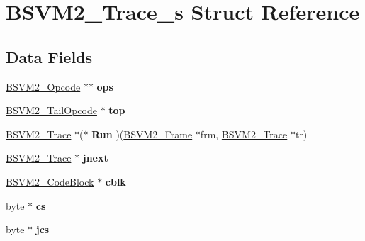 \hypertarget{structBSVM2__Trace__s}{\section{B\-S\-V\-M2\-\_\-\-Trace\-\_\-s Struct Reference}
\label{structBSVM2__Trace__s}
}
\subsection*{Data Fields}
\begin{DoxyCompactItemize}
\item 
\hypertarget{structBSVM2__Trace__s_ad7c1ddfecd2882938c69df3764f0cb3a}{\hyperlink{structBSVM2__Opcode__s}{B\-S\-V\-M2\-\_\-\-Opcode} $\ast$$\ast$ {\bfseries ops}}\label{structBSVM2__Trace__s_ad7c1ddfecd2882938c69df3764f0cb3a}

\item 
\hypertarget{structBSVM2__Trace__s_a4387e192d2bc912200ddb43d1f6862f5}{\hyperlink{structBSVM2__TailOpcode__s}{B\-S\-V\-M2\-\_\-\-Tail\-Opcode} $\ast$ {\bfseries top}}\label{structBSVM2__Trace__s_a4387e192d2bc912200ddb43d1f6862f5}

\item 
\hypertarget{structBSVM2__Trace__s_a6c3e9d1f1dbb248825d27df60f03aa25}{\hyperlink{structBSVM2__Trace__s}{B\-S\-V\-M2\-\_\-\-Trace} $\ast$($\ast$ {\bfseries Run} )(\hyperlink{structBSVM2__Frame__s}{B\-S\-V\-M2\-\_\-\-Frame} $\ast$frm, \hyperlink{structBSVM2__Trace__s}{B\-S\-V\-M2\-\_\-\-Trace} $\ast$tr)}\label{structBSVM2__Trace__s_a6c3e9d1f1dbb248825d27df60f03aa25}

\item 
\hypertarget{structBSVM2__Trace__s_a9c812857dfb6549234de053e43f4d47c}{\hyperlink{structBSVM2__Trace__s}{B\-S\-V\-M2\-\_\-\-Trace} $\ast$ {\bfseries jnext}}\label{structBSVM2__Trace__s_a9c812857dfb6549234de053e43f4d47c}

\item 
\hypertarget{structBSVM2__Trace__s_a13d9991bb4ea3d1fa0b823a29b57edf8}{\hyperlink{structBSVM2__CodeBlock__s}{B\-S\-V\-M2\-\_\-\-Code\-Block} $\ast$ {\bfseries cblk}}\label{structBSVM2__Trace__s_a13d9991bb4ea3d1fa0b823a29b57edf8}

\item 
\hypertarget{structBSVM2__Trace__s_ab55521e933974c020cfeba0c6c213f51}{byte $\ast$ {\bfseries cs}}\label{structBSVM2__Trace__s_ab55521e933974c020cfeba0c6c213f51}

\item 
\hypertarget{structBSVM2__Trace__s_ac9cadf77e1f84980a6ef060161ccbc05}{byte $\ast$ {\bfseries jcs}}\label{structBSVM2__Trace__s_ac9cadf77e1f84980a6ef060161ccbc05}


\end{DoxyCompactItemize}
